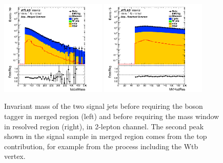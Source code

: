 \begin{figure}[H]
    \centering
     \includegraphics[width=0.45\textwidth]{figures/2lep/dataMC/C_0ptag1pfat0pjet_0ptv_MergedCommon_fatJetMass_Log} 
     \includegraphics[width=0.45\textwidth]{figures/2lep/dataMC/C_0ptag2pjet_0ptv_ResolvedCommon_MVHadRes_Log}
    \caption{Invariant mass of the two signal jets before requiring the boson tagger in merged region (left) and before requiring the mass window in resolved region (right), in 2-lepton channel. 
    The second peak shown in the signal sample in merged region comes from the top contribution, for example from the process including the Wtb vertex.
    }
    \label{fig:MVHadResSR}
\end{figure}

